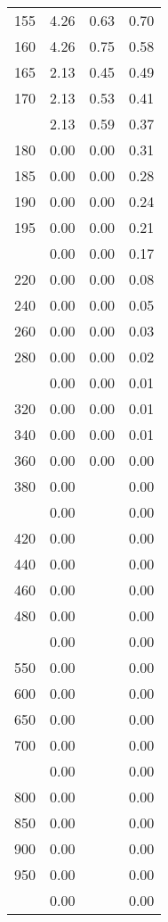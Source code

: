 \begin{table}[ht]
\begin{tabular}{lccc}
  155 & 4.26 & 0.63 & 0.70 \\ 
  160 & 4.26 & 0.75 & 0.58 \\ 
  165 & 2.13 & 0.45 & 0.49 \\ 
  170 & 2.13 & 0.53 & 0.41 \\ 
   \addlinespace
175 & 2.13 & 0.59 & 0.37 \\ 
  180 & 0.00 & 0.00 & 0.31 \\ 
  185 & 0.00 & 0.00 & 0.28 \\ 
  190 & 0.00 & 0.00 & 0.24 \\ 
  195 & 0.00 & 0.00 & 0.21 \\ 
   \addlinespace
200 & 0.00 & 0.00 & 0.17 \\ 
  220 & 0.00 & 0.00 & 0.08 \\ 
  240 & 0.00 & 0.00 & 0.05 \\ 
  260 & 0.00 & 0.00 & 0.03 \\ 
  280 & 0.00 & 0.00 & 0.02 \\ 
   \addlinespace
300 & 0.00 & 0.00 & 0.01 \\ 
  320 & 0.00 & 0.00 & 0.01 \\ 
  340 & 0.00 & 0.00 & 0.01 \\ 
  360 & 0.00 & 0.00 & 0.00 \\ 
  380 & 0.00 &  & 0.00 \\ 
   \addlinespace
400 & 0.00 &  & 0.00 \\ 
  420 & 0.00 &  & 0.00 \\ 
  440 & 0.00 &  & 0.00 \\ 
  460 & 0.00 &  & 0.00 \\ 
  480 & 0.00 &  & 0.00 \\ 
   \addlinespace
500 & 0.00 &  & 0.00 \\ 
  550 & 0.00 &  & 0.00 \\ 
  600 & 0.00 &  & 0.00 \\ 
  650 & 0.00 &  & 0.00 \\ 
  700 & 0.00 &  & 0.00 \\ 
   \addlinespace
750 & 0.00 &  & 0.00 \\ 
  800 & 0.00 &  & 0.00 \\ 
  850 & 0.00 &  & 0.00 \\ 
  900 & 0.00 &  & 0.00 \\ 
  950 & 0.00 &  & 0.00 \\ 
   \addlinespace
1000 & 0.00 &  & 0.00 \\ 
   \bottomrule
\end{tabular}
\end{table}
